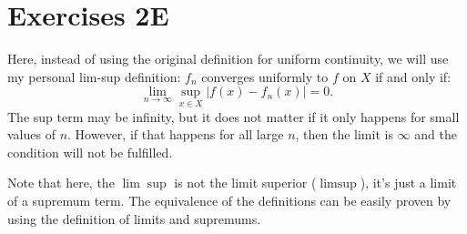 
\section{Exercises 2E} %
\label{sec:Exercises 2E}

Here, instead of using the original definition for uniform continuity, we will
use my personal lim-sup definition: \( f_{n} \) converges uniformly to \(
f\) on \( X \) if and only if:
\[
  \lim_{n \to \infty} \sup_{x \in X} |f(x)-f_{n}(x)| = 0
.\] 
The sup term may be infinity, but it does not matter if it only happens for
small values of \( n \). However, if that happens for all large \( n \), then
the limit is \( \infty \) and the condition will not be fulfilled.

Note that here, the \( \lim \sup \) is not the limit superior (\( \limsup \)),
it's just a limit of a supremum term. The equivalence of the definitions can be
easily proven by using the definition of limits and supremums.

